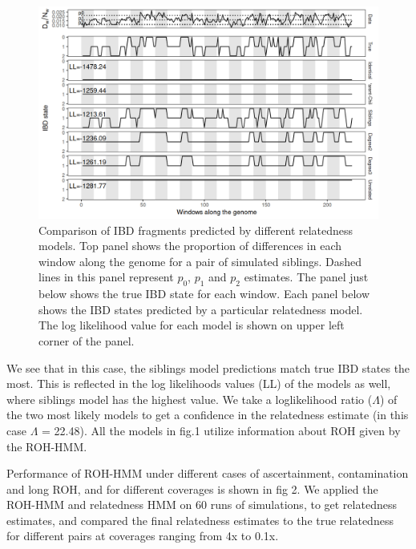\documentclass[12pt, letterpaper]{article}
\begin{document}
\begin{figure}[h]
    \centering
    \includegraphics[width=18cm]{plots/plotimg/IBDplot.png}
    \caption{Comparison of IBD fragments predicted by different relatedness models. Top panel shows the proportion of differences in each window along the genome for a pair of simulated siblings. Dashed lines in this panel represent $p_0$, $p_1$ and $p_2$ estimates. The panel just below shows the true IBD state for each window. Each panel below shows the IBD states predicted by a particular relatedness model. The log likelihood value for each model is shown on upper left corner of the panel. }
    \label{fig:ibd}
\end{figure}


We see that in this case, the siblings model predictions match true IBD states the most. This is reflected in the log likelihoods values (LL) of the models as well, where siblings model has the highest value. We take a loglikelihood ratio ($\Lambda$) of the two most likely models to get a confidence in the relatedness estimate (in this case $\Lambda$ = 22.48). All the models in fig.1 utilize information about ROH given by the ROH-HMM. 


Performance of ROH-HMM under different cases of ascertainment, contamination and long ROH, and for different coverages is shown in fig 2. We applied the ROH-HMM and relatedness HMM on 60 runs of simulations, to get relatedness estimates, and compared the final relatedness estimates to the true relatedness for different pairs at coverages ranging from 4x to 0.1x. 
\end{document}
